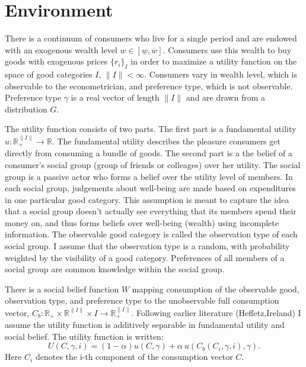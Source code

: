 \documentclass{article}
\begin{document}
\section{Environment}
There is a continuum of consumers who live for a single period and are endowed with an exogenous wealth level $w \in \left[ \underline{w},\overline{w} \right]$.
Consumers use this wealth to buy goods with exogenous prices $\{r_i\}_I$ in order to maximize a utility function on the space of good categories $I$, $\|I\|<\infty$. 
Consumers vary in wealth level, which is observable to the econometrician, and preference type, which is not observable.
Preference type $\gamma$ is a real vector of length $\|I\|$ and are drawn from a distribution $G$.

The utility function consists of two parts.  The first part is a fundamental utility $u:\mathbb{R}_+^{\|I\|}\rightarrow\mathbb{R}$.
The fundamental utility describes the pleasure consumers get directly from consuming a bundle of goods.
The second part is a the belief of a consumer's social group (group of friends or colleages) over her utility.
The social group is a passive actor who forms a belief over the utility level of members.  
In each social group, judgements about well-being are made based on expenditures in one particular good category.
This assumption is meant to capture the idea that a social group doesn't actually see everything that its members spend their money on, and thus forms beliefs over well-being (wealth) using incomplete information.
The observable good category is called the observation type of each social group.
I assume that the observation type is a random, with probability weighted by the visibility of a good category.
Preferences of all members of a social group are common knowledge within the social group.

There is a social belief function $W$ mapping consumption of the observable good, observation type, and preference type to the unobservable full consumption vector, $C_b: \mathbb{R}_+\times\mathbb{R}^{\|I\|}\times I\rightarrow \mathbb{R}_+^{\|I\|}$.
Following earlier literature (Heffetz,Ireland) I assume the utility function is additively separable in fundamental utility and social belief.
The utility function is written:
\[U(C,\gamma,i) = (1-\alpha) u(C,\gamma) + \alpha\  u(C_b(C_i,\gamma,i),\gamma).\]
Here $C_i$ denotes the i-th component of the consumption vector $C$.
\end{document}
